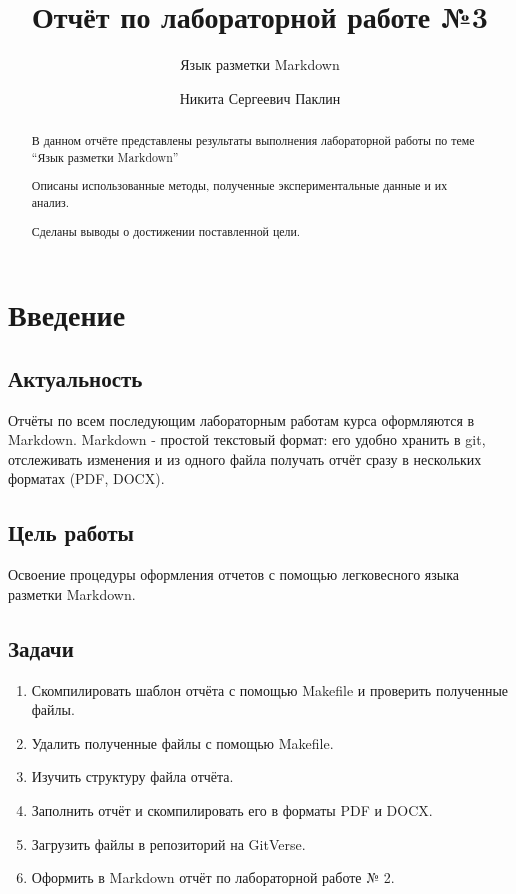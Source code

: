 \documentclass[
  english,
  russian,
  12pt,
  a4paper,
  DIV=11,
  numbers=noendperiod]{scrreprt}
\title{Отчёт по лабораторной работе №3}
\subtitle{Язык разметки Markdown}
\author{Никита Сергеевич Паклин}
\date{}
\providecommand{\tightlist}{%
  \setlength{\itemsep}{0pt}\setlength{\parskip}{0pt}}
\renewcommand*\contentsname{Содержание}
\newcommand\contentsname{Содержание}
\begin{document}
\maketitle
\begin{abstract}
В данном отчёте представлены результаты выполнения лабораторной работы
по теме ``Язык разметки Markdown''

Описаны использованные методы, полученные экспериментальные данные и их
анализ.

Сделаны выводы о достижении поставленной цели.
\end{abstract}

\renewcommand*\contentsname{Содержание}
{
\setcounter{tocdepth}{1}
\tableofcontents
}
\listoffigures
\listoftables

\chapter{Введение}\label{ux432ux432ux435ux434ux435ux43dux438ux435}

\section{Актуальность}\label{ux430ux43aux442ux443ux430ux43bux44cux43dux43eux441ux442ux44c}

Отчёты по всем последующим лабораторным работам курса оформляются в
Markdown. Markdown - простой текстовый формат: его удобно хранить в git,
отслеживать изменения и из одного файла получать отчёт сразу в
нескольких форматах (PDF, DOCX).

\section{Цель
работы}\label{ux446ux435ux43bux44c-ux440ux430ux431ux43eux442ux44b}

Освоение процедуры оформления отчетов с помощью легковесного языка
разметки Markdown.

\section{Задачи}\label{ux437ux430ux434ux430ux447ux438}

\begin{enumerate}
\def\labelenumi{\arabic{enumi}.}
\tightlist
\item
  Скомпилировать шаблон отчёта с помощью Makefile и проверить полученные
  файлы.
\item
  Удалить полученные файлы с помощью Makefile.
\item
  Изучить структуру файла отчёта.
\item
  Заполнить отчёт и скомпилировать его в форматы PDF и DOCX.
\item
  Загрузить файлы в репозиторий на GitVerse.
\item
  Оформить в Markdown отчёт по лабораторной работе № 2.
\end{enumerate}
\end{document}
